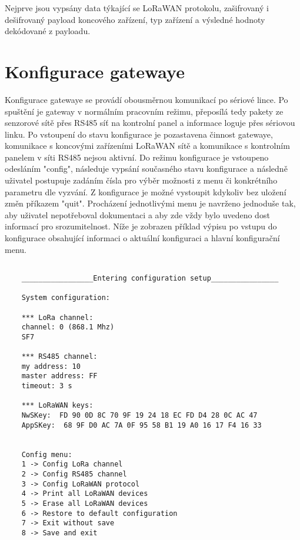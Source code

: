Nejprve jsou vypsány data týkající se LoRaWAN protokolu, zašifrovaný i dešifrovaný payload koncového zařízení, typ zařízení a výsledné hodnoty dekódované z payloadu.



\section{Konfigurace gatewaye}
\label{Konfigurace gatewaye}
Konfigurace gatewaye se provádí obousměrnou komunikací po sériové lince. 
Po spuštění je gateway v normálním pracovním režimu, přeposílá tedy pakety ze senzorové sítě přes RS485 síť na kontrolní panel a informace loguje přes sériovou linku.
Po vstoupení do stavu konfigurace je pozastavena činnost gatewaye, komunikace s koncovými zařízeními LoRaWAN sítě a komunikace s kontrolním panelem v síti RS485 nejsou aktivní.
Do režimu konfigurace je vstoupeno odesláním "config", následuje vypsání současného stavu konfigurace a následně uživatel postupuje zadáním čísla pro výběr možnosti z menu či konkrétního parametru dle vyzvání. Z konfigurace je možné vystoupit kdykoliv bez uložení změn příkazem "quit". 
Procházení jednotlivými menu je navrženo jednoduše tak, aby uživatel nepotřeboval dokumentaci a aby zde vždy bylo uvedeno dost informací pro srozumitelnost.
Níže je zobrazen příklad výpisu po vstupu do konfigurace obsahující informaci o aktuální konfiguraci a hlavní konfigurační menu.

\begin{lstlisting}[style=log]

    _________________Entering configuration setup________________
    
    System configuration:
    
    *** LoRa channel: 
    channel: 0 (868.1 Mhz)
    SF7
    
    *** RS485 channel: 
    my address: 10
    master address: FF
    timeout: 3 s
    
    *** LoRaWAN keys: 
    NwSKey:  FD 90 0D 8C 70 9F 19 24 18 EC FD D4 28 0C AC 47
    AppSKey:  68 9F D0 AC 7A 0F 95 58 B1 19 A0 16 17 F4 16 33
    
    
    Config menu:
    1 -> Config LoRa channel
    2 -> Config RS485 channel
    3 -> Config LoRaWAN protocol
    4 -> Print all LoRaWAN devices
    5 -> Erase all LoRaWAN devices
    6 -> Restore to default configuration
    7 -> Exit without save
    8 -> Save and exit

\end{lstlisting}
    

